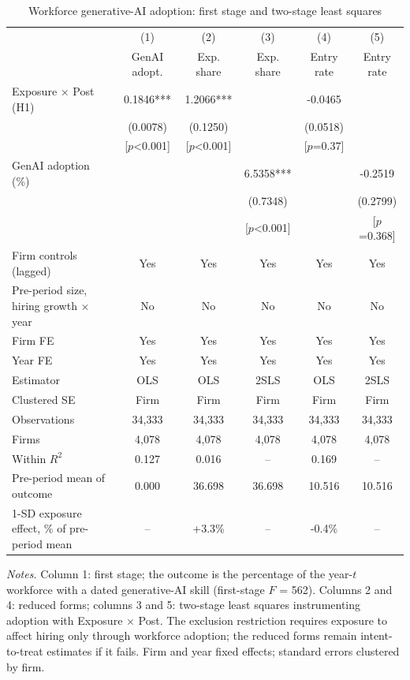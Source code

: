 \begin{table}[!htbp]\centering\footnotesize\setlength{\tabcolsep}{4pt}
\caption{Workforce generative-AI adoption: first stage and two-stage least squares}\label{tab:iv}
\begin{tabular*}{\linewidth}{@{\extracolsep{\fill}}lccccc@{}}
\toprule
 & (1) & (2) & (3) & (4) & (5) \\
 & GenAI adopt. & Exp. share & Exp. share & Entry rate & Entry rate \\
\midrule
Exposure $\times$ Post (H1) & 0.1846*** & 1.2066*** &  & -0.0465 &  \\
 & (0.0078) & (0.1250) &  & (0.0518) &  \\
 & [$p$<0.001] & [$p$<0.001] &  & [$p$=0.37] &  \\
GenAI adoption (\%) &  &  & 6.5358*** &  & -0.2519 \\
 &  &  & (0.7348) &  & (0.2799) \\
 &  &  & [$p$<0.001] &  & [$p$=0.368] \\
\midrule
Firm controls (lagged) & Yes & Yes & Yes & Yes & Yes \\
Pre-period size, hiring growth $\times$ year & No & No & No & No & No \\
Firm FE & Yes & Yes & Yes & Yes & Yes \\
Year FE & Yes & Yes & Yes & Yes & Yes \\
Estimator & OLS & OLS & 2SLS & OLS & 2SLS \\
Clustered SE & Firm & Firm & Firm & Firm & Firm \\
Observations & 34,333 & 34,333 & 34,333 & 34,333 & 34,333 \\
Firms & 4,078 & 4,078 & 4,078 & 4,078 & 4,078 \\
Within $R^2$ & 0.127 & 0.016 & -- & 0.169 & -- \\
Pre-period mean of outcome & 0.000 & 36.698 & 36.698 & 10.516 & 10.516 \\
1-SD exposure effect, \% of pre-period mean & -- & +3.3\% & -- & -0.4\% & -- \\
\bottomrule
\end{tabular*}
\begin{minipage}{0.97\linewidth}\vspace{2pt}\scriptsize\textit{Notes.} Column 1: first stage; the outcome is the percentage of the year-$t$ workforce with a dated generative-AI skill (first-stage $F$ = 562). Columns 2 and 4: reduced forms; columns 3 and 5: two-stage least squares instrumenting adoption with Exposure $\times$ Post. The exclusion restriction requires exposure to affect hiring only through workforce adoption; the reduced forms remain intent-to-treat estimates if it fails. Firm and year fixed effects; standard errors clustered by firm.\end{minipage}
\end{table}